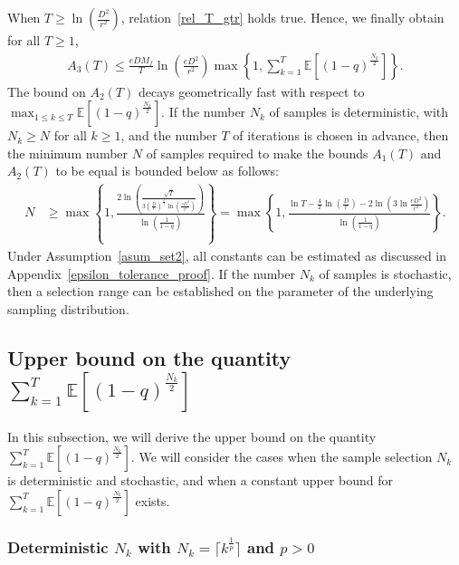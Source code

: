 \documentclass{article}
\newcommand{\EXP}[1]
{\mathbb{E}\!\left[#1\right] }
\theoremstyle{plain}
\theoremstyle{definition}
\theoremstyle{remark}
\begin{document}
When $T \geq \ln \left( \frac{D^2}{r^2} \right)$, relation~\eqref{rel_T_gtr} holds true. Hence, we finally obtain for all $T \geq 1$,
\begin{align*}
    A_3(T) \leq \frac{ e D M_f}{T} \ln \left( \frac{e D^2}{r^2} \right) \max \left\{1, \sum_{k=1}^T \EXP{(1-q)^{\frac{N_{k}}{2}}} \right\} .
\end{align*}
%
%
The bound on $A_2(T)$ decays geometrically fast with respect to $\max_{1 \leq k \leq T} \EXP{(1-q)^{\frac{N_{k}}{2}}}$. If the number $N_k$ of samples is deterministic, with $N_k \geq N$ for all $k \geq 1$, and the number $T$ of iterations is chosen in advance, then the minimum number $N$ of samples required to make the bounds $A_1(T)$ and $A_2(T)$ to be equal is bounded below as follows:
\begin{align*}
    N &\geq \max \left\{ 1, \frac{2 \ln \left( \frac{\sqrt{T}}{3 \left(\frac{D}{r}\right)^{\frac{2}{T}} \ln \left( \frac{e D^2}{r^2} \right)} \right)}{\ln \left( \frac{1}{1-q} \right)} \right\} = \max \left\{ 1, \frac{\ln T - \frac{4}{T}\ln \left(\frac{D}{r}\right) - 2\ln \left( 3 \ln \frac{e D^2}{r^2} \right)}{\ln \left( \frac{1}{1-q} \right)} \right\} .
\end{align*}
Under Assumption~\ref{asum_set2}, all constants can be estimated as discussed in Appendix~\ref{epsilon_tolerance_proof}. If the number $N_k$ of samples is stochastic, then a selection range can be established on the parameter of the underlying sampling distribution.



\subsection{Upper bound on the quantity $\sum_{k=1}^T \EXP{(1-q)^{\frac{N_{k}}{2}}}$}\label{appendx_sum_bd}

In this subsection, we will derive the upper bound on the quantity $\sum_{k=1}^T \EXP{(1-q)^{\frac{N_{k}}{2}}}$. We will consider the cases when the sample selection $N_k$ is deterministic and stochastic, and when a constant upper bound for $\sum_{k=1}^T \EXP{(1-q)^{\frac{N_{k}}{2}}}$ exists.

\subsubsection{Deterministic $N_k$ with $N_k = \lceil k^{\frac{1}{p}} \rceil$ and $p >0$}\label{appndx_det_samples}
\end{document}
